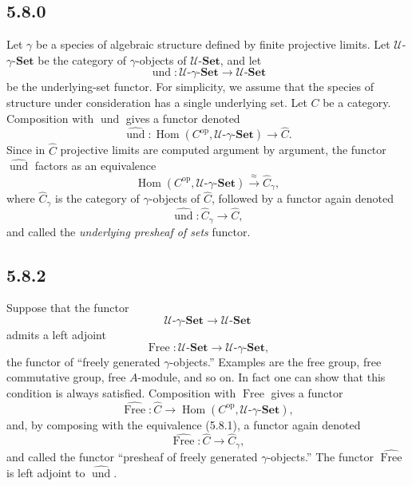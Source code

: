 \documentclass[11pt]{article}
\newcommand{\U}{\mathcal{U}}
\newcommand{\Set}{\mathbf{Set}}
\newcommand{\op}{\mathrm{op}}
\newcommand{\esj}{\operatorname{und}}
\newcommand{\Lib}{\operatorname{Free}}
\newcommand{\Hhom}{\operatorname{Hom}}
\begin{document}
\subsection*{5.8.0}
Let $\gamma$ be a species of algebraic structure defined by finite projective limits. Let $\U$-$\gamma$-$\Set$ be the category of $\gamma$-objects of $\U$-$\Set$, and let
\[
\esj:\U\text{-}\gamma\text{-}\Set\longrightarrow\U\text{-}\Set
\]
be the underlying-set functor. For simplicity, we assume that the species of structure under consideration has a single underlying set. Let $C$ be a category. Composition with $\esj$ gives a functor denoted
\[
\widehat{\esj}:\Hhom(C^{\op},\U\text{-}\gamma\text{-}\Set)\longrightarrow\widehat C.
\]
Since in $\widehat C$ projective limits are computed argument by argument, the functor $\widehat{\esj}$ factors as an equivalence
\[
\tag{5.8.1}
\Hhom(C^{\op},\U\text{-}\gamma\text{-}\Set)\xrightarrow{\approx}\widehat C_\gamma,
\]
where $\widehat C_\gamma$ is the category of $\gamma$-objects of $\widehat C$, followed by a functor again denoted
\[
\widehat{\esj}:\widehat C_\gamma\longrightarrow\widehat C,
\]
and called the \emph{underlying presheaf of sets} functor.

\subsection*{5.8.2}
Suppose that the functor
\[
\U\text{-}\gamma\text{-}\Set\longrightarrow\U\text{-}\Set
\]
admits a left adjoint
\[
\Lib:\U\text{-}\Set\longrightarrow\U\text{-}\gamma\text{-}\Set,
\]
the functor of ``freely generated $\gamma$-objects.'' Examples are the free group, free commutative group, free $A$-module, and so on. In fact one can show that this condition is always satisfied. Composition with $\Lib$ gives a functor
\[
\widehat{\Lib}:\widehat C\longrightarrow\Hhom(C^{\op},\U\text{-}\gamma\text{-}\Set),
\]
and, by composing with the equivalence (5.8.1), a functor again denoted
\[
\widehat{\Lib}:\widehat C\longrightarrow\widehat C_\gamma,
\]
and called the functor ``presheaf of freely generated $\gamma$-objects.'' The functor $\widehat{\Lib}$ is left adjoint to $\widehat{\esj}$.
\end{document}
